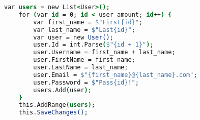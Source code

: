 \begin{lstlisting}[language=csh,caption={Populating ASP.NET Core \acrshort{db}},breaklines=true,label={lst:aspnetSeedDb}]
    var users = new List<User>();
    for (var id = 0; id < user_amount; id++) {
        var first_name = $"First{id}";
        var last_name = $"Last{id}";
        var user = new User();
        user.Id = int.Parse($"{id + 1}");
        user.Username = first_name + last_name;
        user.FirstName = first_name;
        user.LastName = last_name;
        user.Email = $"{first_name}@{last_name}.com";
        user.Password = $"Pass{id}!";
        users.Add(user);
    }
    this.AddRange(users);
    this.SaveChanges();
\end{lstlisting}
